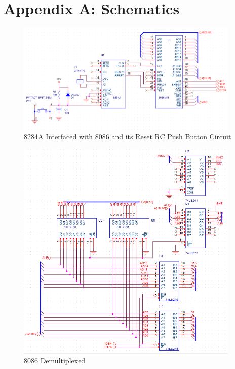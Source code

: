 \newpage

\appendix {}

    \section{Appendix A: Schematics} \label{appendix:schematics}

        \begin{figure}[ht]
            \begin{center}
                \includegraphics[width=0.95\textwidth]{figures/schematics/page1.png}
                \caption{8284A Interfaced with 8086 and its Reset RC Push Button Circuit} \label{fig:page1}
            \end{center}
        \end{figure}

        \begin{figure}[ht]
            \begin{center}
                \includegraphics[width=0.95\textwidth]{figures/schematics/page2.png}
                \caption{8086 Demultiplexed} \label{fig:page2}
            \end{center}
        \end{figure}


